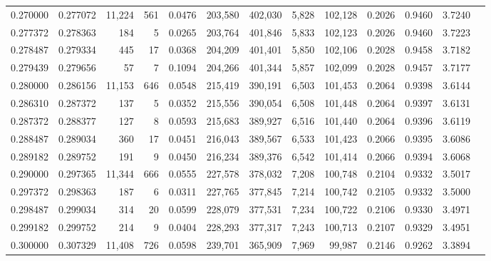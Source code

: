 \begin{tabular}{rrrrrrrrrrrrr}
0.270000 & 0.277072 & 11,224 &   561 &                                     0.0476 & 203,580 & 402,030 &   5,828 & 102,128 & 0.2026 & 0.9460 & 3.7240 \\
0.277372 & 0.278363 &    184 &     5 &                                     0.0265 & 203,764 & 401,846 &   5,833 & 102,123 & 0.2026 & 0.9460 & 3.7223 \\
0.278487 & 0.279334 &    445 &    17 &                                     0.0368 & 204,209 & 401,401 &   5,850 & 102,106 & 0.2028 & 0.9458 & 3.7182 \\
0.279439 & 0.279656 &     57 &     7 &                                     0.1094 & 204,266 & 401,344 &   5,857 & 102,099 & 0.2028 & 0.9457 & 3.7177 \\
0.280000 & 0.286156 & 11,153 &   646 &                                     0.0548 & 215,419 & 390,191 &   6,503 & 101,453 & 0.2064 & 0.9398 & 3.6144 \\
0.286310 & 0.287372 &    137 &     5 &                                     0.0352 & 215,556 & 390,054 &   6,508 & 101,448 & 0.2064 & 0.9397 & 3.6131 \\
0.287372 & 0.288377 &    127 &     8 &                                     0.0593 & 215,683 & 389,927 &   6,516 & 101,440 & 0.2064 & 0.9396 & 3.6119 \\
0.288487 & 0.289034 &    360 &    17 &                                     0.0451 & 216,043 & 389,567 &   6,533 & 101,423 & 0.2066 & 0.9395 & 3.6086 \\
0.289182 & 0.289752 &    191 &     9 &                                     0.0450 & 216,234 & 389,376 &   6,542 & 101,414 & 0.2066 & 0.9394 & 3.6068 \\
0.290000 & 0.297365 & 11,344 &   666 &                                     0.0555 & 227,578 & 378,032 &   7,208 & 100,748 & 0.2104 & 0.9332 & 3.5017 \\
0.297372 & 0.298363 &    187 &     6 &                                     0.0311 & 227,765 & 377,845 &   7,214 & 100,742 & 0.2105 & 0.9332 & 3.5000 \\
0.298487 & 0.299034 &    314 &    20 &                                     0.0599 & 228,079 & 377,531 &   7,234 & 100,722 & 0.2106 & 0.9330 & 3.4971 \\
0.299182 & 0.299752 &    214 &     9 &                                     0.0404 & 228,293 & 377,317 &   7,243 & 100,713 & 0.2107 & 0.9329 & 3.4951 \\
0.300000 & 0.307329 & 11,408 &   726 &                                     0.0598 & 239,701 & 365,909 &   7,969 &  99,987 & 0.2146 & 0.9262 & 3.3894 \\

\end{tabular}
